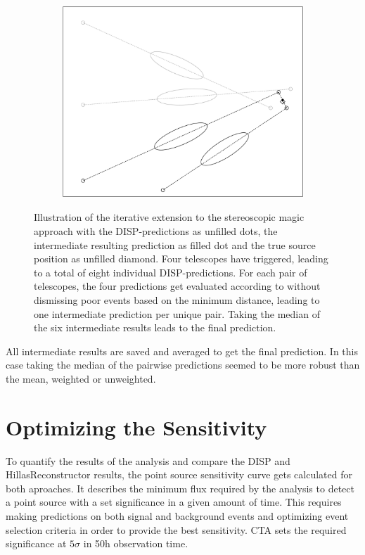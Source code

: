 \begin{figure}
\begin{subfigure}{0.45\textwidth}
        \includegraphics[width=\linewidth]{Plots/stereo_magic_6.pdf} 
    \end{subfigure}
    \caption{
    Illustration of the iterative extension to the stereoscopic magic approach
    with the DISP-predictions as unfilled dots, the intermediate resulting prediction
    as filled dot and the true source position as unfilled diamond.
    Four telescopes have triggered, leading to a total of eight individual DISP-predictions.
    For each pair of telescopes, the four predictions get evaluated according to \cite{ALEKSIC201676}
    without dismissing poor events based on the minimum distance, leading to one 
    intermediate prediction per unique pair.
    Taking the median of the six intermediate results leads to the final prediction.}
    \label{fig:stereo_disp}
\end{figure}

All intermediate results are saved and averaged to get the final prediction.
In this case taking the median of the pairwise predictions seemed to be more robust
than the mean, weighted or unweighted.


\section{Optimizing the Sensitivity}
To quantify the results of the analysis and compare the 
DISP and HillasReconstructor results, the point source sensitivity 
curve gets calculated for both aproaches.
It describes the minimum flux required by the analysis to detect a point
source with a set significance in a given amount of time.
This requires making predictions on both signal and background events
and optimizing event selection criteria in order to provide the best sensitivity.
CTA sets the required significance at $5\sigma$ in 50h observation time.

